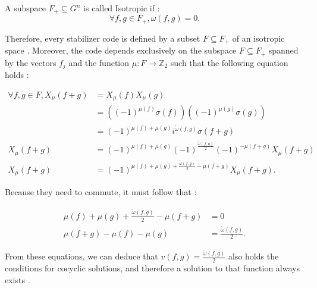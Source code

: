 \begin{definition}
  A subspace $F_+ \subseteq G^n$ is called Isotropic if \citep{Kitaev2002}:
  \begin{equation}
    \forall f, g \in F_+, \omega(f, g) = 0
    \label{eq:isotropic}
  .\end{equation}
\end{definition}

Therefore, every stabilizer code is defined by a subset $F \subseteq F_+$ of an isotropic space \citep{Kitaev2002}. Moreover, the code depends exclusively on the subspace $F \subseteq F_+$ spanned by the vectors $f_j$ and the function $\mu : F \to \mathbb{Z}_2$ such that the following equation holds \citep{Cesar2024}:

\begin{align*}
  \forall f, g \in F, X_\mu(f + g) &= X_\mu(f)X_\mu(g)\\
  &= \left((-1)^{\mu(f)}\sigma(f)\right)\left((-1)^{\mu(g)}\sigma(g)\right)\\ 
  &= (-1)^{\mu(f) + \mu(g)} i^{\tilde{\omega}(f, g)}\sigma(f + g)\\
  X_\mu(f + g) &= (-1)^{\mu(f) + \mu(g)} (-1)^{\frac{\tilde{\omega}(f, g)}{2}}(-1)^{- \mu(f + g)} X_\mu(f + g)\\
  X_\mu(f + g) &= (-1)^{\mu(f) + \mu(g) + \frac{\tilde{\omega}(f, g)}{2} - \mu(f + g)} X_\mu(f + g)
.\end{align*}

Because they need to commute, it must follow that \citep{Cesar2024}:

\begin{align*}
  \mu(f) + \mu(g) + \frac{\tilde{\omega}(f, g)}{2} - \mu(f + g) &= 0\\
  \mu(f + g) - \mu(f) - \mu(g) &= \frac{\tilde{\omega}(f, g)}{2}
.\end{align*}

From these equations, we can deduce that $v(f, g) = \frac{\tilde{\omega}(f, g)}{2}$ also holds the conditions for cocyclic solutions, and therefore a solution to that function always exists \citep{Cesar2024}.

